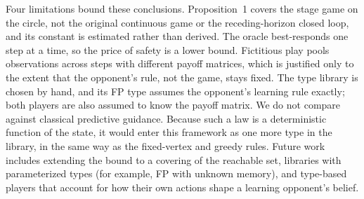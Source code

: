 \documentclass[letterpaper, 10 pt, conference]{ieeeconf}  %
\begin{document}
Four limitations bound these conclusions. Proposition~1 covers the stage game on the circle, not the original continuous game or the receding-horizon closed loop, and its constant is estimated rather than derived. The oracle best-responds one step at a time, so the price of safety is a lower bound. Fictitious play pools observations across steps with different payoff matrices, which is justified only to the extent that the opponent's rule, not the game, stays fixed. The type library is chosen by hand, and its FP type assumes the opponent's learning rule exactly; both players are also assumed to know the payoff matrix. We do not compare against classical predictive guidance. Because such a law is a deterministic function of the state, it would enter this framework as one more type in the library, in the same way as the fixed-vertex and greedy rules. Future work includes extending the bound to a covering of the reachable set, libraries with parameterized types (for example, FP with unknown memory), and type-based players that account for how their own actions shape a learning opponent's belief.


\addtolength{\textheight}{-12cm}   %







\end{document}
